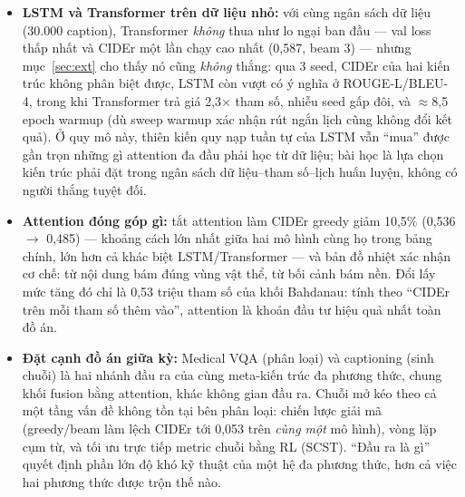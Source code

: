 \begin{itemize}
	\item \textbf{LSTM và Transformer trên dữ liệu nhỏ:} với cùng ngân sách dữ
	      liệu (30.000 caption), Transformer \emph{không} thua như lo ngại ban
	      đầu --- val loss thấp nhất và CIDEr một lần chạy cao nhất (0,587,
	      beam 3) --- nhưng mục~\ref{sec:ext} cho thấy nó cũng \emph{không}
	      thắng: qua 3 seed, CIDEr của hai kiến trúc không phân biệt được,
	      LSTM còn vượt có ý nghĩa ở ROUGE-L/BLEU-4, trong khi Transformer trả
	      giá 2,3$\times$ tham số, nhiễu seed gấp đôi, và $\approx$8,5 epoch
	      warmup (dù sweep warmup xác nhận rút ngắn lịch cũng không đổi kết
	      quả). Ở quy mô này, thiên kiến quy nạp tuần tự của LSTM vẫn ``mua''
	      được gần trọn những gì attention đa đầu phải học từ dữ liệu; bài học
	      là lựa chọn kiến trúc phải đặt trong ngân sách dữ liệu--tham
	      số--lịch huấn luyện, không có người thắng tuyệt đối.
	\item \textbf{Attention đóng góp gì:} tắt attention làm CIDEr greedy giảm
	      10,5\% (0,536 $\to$ 0,485) --- khoảng cách lớn nhất giữa hai mô hình
	      cùng họ trong bảng chính, lớn hơn cả khác biệt LSTM/Transformer ---
	      và bản đồ nhiệt xác nhận cơ chế: từ nội dung bám đúng vùng vật thể,
	      từ bối cảnh bám nền. Đổi lấy mức tăng đó chỉ là 0,53 triệu tham số
	      của khối Bahdanau: tính theo ``CIDEr trên mỗi tham số thêm vào'',
	      attention là khoản đầu tư hiệu quả nhất toàn đồ án.
	\item \textbf{Đặt cạnh đồ án giữa kỳ:} Medical VQA (phân loại) và captioning
	      (sinh chuỗi) là hai nhánh đầu ra của cùng meta-kiến trúc đa phương
	      thức, chung khối fusion bằng attention, khác không gian đầu ra. Chuỗi
	      mở kéo theo cả một tầng vấn đề không tồn tại bên phân loại: chiến
	      lược giải mã (greedy/beam làm lệch CIDEr tới 0,053 trên \emph{cùng
	      một} mô hình), vòng lặp cụm từ, và tối ưu trực tiếp metric chuỗi bằng
	      RL (SCST). ``Đầu ra là gì'' quyết định phần lớn độ khó kỹ thuật của
	      một hệ đa phương thức, hơn cả việc hai phương thức được trộn thế nào.
\end{itemize}
